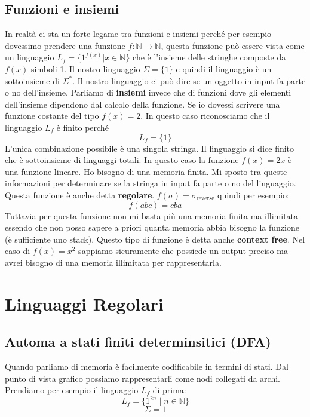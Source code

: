 \documentclass[a4paper]{article}
\begin{document}
\subsection{Funzioni e insiemi}

In realtà ci sta un forte legame tra funzioni e insiemi perché per esempio dovessimo prendere una funzione
$f : \mathbb{N} \rightarrow \mathbb{N}$, questa funzione può essere vista come un linguaggio $L_f = \{1^{f(x)} | x \in \mathbb{N}\}$ 
che è l'insieme delle stringhe composte da $f(x)$ simboli 1.
Il nostro linguaggio $\Sigma = \{1\}$ e quindi il linguaggio è un sottoinsieme di $\Sigma^*$.
Il nostro linguaggio ci può dire se un oggetto in input fa parte o no dell'insieme.
Parliamo di \textbf{insiemi} invece che di funzioni
dove gli elementi dell'insieme dipendono dal calcolo della funzione.
\ex{}
{
    Se io dovessi scrivere una funzione costante del tipo $f(x) = 2$.
    In questo caso riconosciamo che il linguaggio $L_f$ è finito perché
    \[L_f = \{1\}\]
    L'unica combinazione possibile è una singola stringa.
    Il linguaggio si dice finito che è sottoinsieme di linguaggi totali.
}
\ex{}
{
    In questo caso la funzione $f(x) = 2x$ è una funzione lineare.
    Ho bisogno di una memoria finita. Mi sposto tra queste informazioni per
    determinare se la stringa in input fa parte o no del linguaggio.
    Questa funzione è anche detta \textbf{regolare}.
}
\ex{}
{
    $f(\sigma) = \sigma_{\text{reverse}}$ quindi per esempio:
    \[f(abc) = cba\]
    Tuttavia per questa funzione non mi basta più una memoria finita ma
    illimitata essendo che non posso sapere a priori quanta memoria abbia bisogno la funzione
    (è sufficiente uno stack).
    Questo tipo di funzione è detta anche \textbf{context free}.
}
\ex{}
{
    Nel caso di $f(x) = x^2$ sappiamo sicuramente
    che possiede un output preciso ma avrei bisogno di una memoria illimitata per rappresentarla.
}

\section{Linguaggi Regolari}

\subsection{Automa a stati finiti determinsitici (DFA)}

Quando parliamo di memoria è facilmente codificabile 
in termini di stati. Dal punto di vista grafico possiamo rappresentarli
come nodi collegati da archi.
Prendiamo per esempio il linguaggio $L_f$ di prima:
\[L_f = \{1^{2n} \; | \; n \in \mathbb{N}\}\]
\[\Sigma = {1}\]
\end{document}
